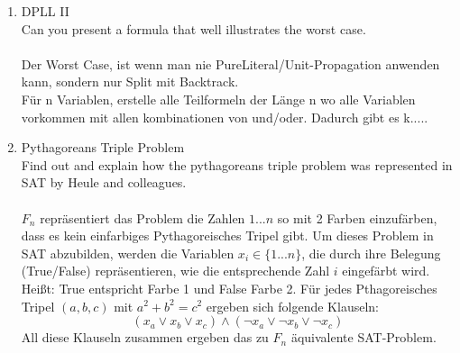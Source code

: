 \documentclass[a4paper,twoside,12pt]{article}
\newcounter{AUFGNR}
\newcommand{\AUFGABE}[1]{\vspace{0.3cm}\item[Exercise~{\arabic{AUFGNR}}:]\stepcounter{AUFGNR} #1\\[1ex]}
\begin{document}
\begin{enumerate}[wide=-0.2cm]
	\AUFGABE{DPLL II}
	Can you present a formula that well illustrates the worst case.\\
	\\
	Der Worst Case, ist wenn man nie PureLiteral/Unit-Propagation anwenden kann, sondern nur Split mit Backtrack.\\
	Für n Variablen, erstelle alle Teilformeln der Länge n wo alle Variablen vorkommen mit allen kombinationen von und/oder. Dadurch gibt es k.....
	\AUFGABE{Pythagoreans Triple Problem}
	Find out and explain how the pythagoreans triple problem was represented in SAT by Heule and colleagues.\\
	\\
	\(F_n\) repräsentiert das Problem die Zahlen \(1...n\) so mit 2 Farben einzufärben, dass es kein einfarbiges Pythagoreisches Tripel gibt. Um dieses Problem in SAT abzubilden, werden die Variablen \(x_i \in  \{1...n\}\), die durch ihre Belegung (True/False) repräsentieren, wie die entsprechende Zahl \(i\) eingefärbt wird. Heißt: True entspricht Farbe 1 und False Farbe 2.  Für jedes Pthagoreisches Tripel \((a,b,c)\) mit \(a^2 + b^2  = c^2\) ergeben sich folgende Klauseln: 
	\[(x_a \vee x_b \vee x_c) \wedge (\neg  x_a \vee \neg x_b \vee \neg x_c)\] All diese Klauseln zusammen ergeben das zu \(F_n\) äquivalente SAT-Problem.
	
\end{enumerate}
\end{document}
